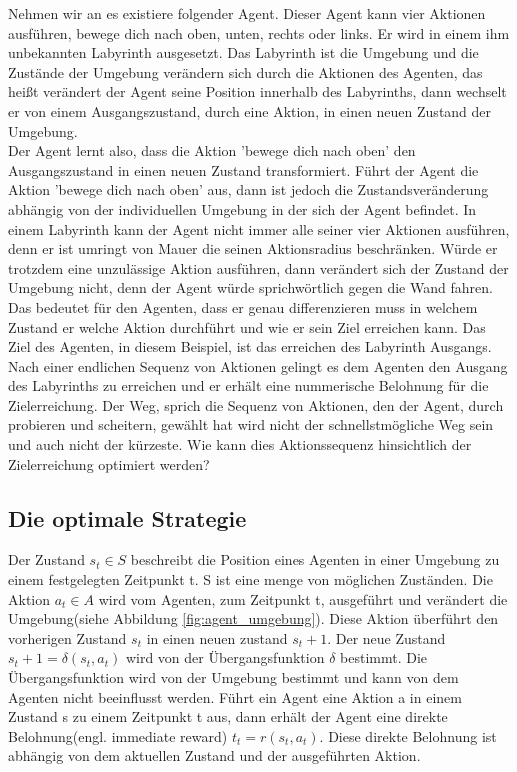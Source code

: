 Nehmen wir an es existiere folgender Agent. Dieser Agent kann vier Aktionen ausführen, bewege dich nach oben, unten, rechts oder links. Er wird in einem ihm unbekannten Labyrinth ausgesetzt. Das Labyrinth ist die Umgebung und die Zustände der Umgebung verändern sich durch die Aktionen des Agenten, das heißt verändert der Agent seine Position innerhalb des Labyrinths, dann wechselt er von einem Ausgangszustand, durch eine Aktion, in einen neuen Zustand der Umgebung. \\

Der Agent lernt also, dass die Aktion 'bewege dich nach oben' den Ausgangszustand in einen neuen Zustand transformiert. Führt der Agent die Aktion 'bewege dich nach oben' aus, dann ist jedoch die Zustandsveränderung abhängig von der individuellen Umgebung in der sich der Agent befindet. In einem Labyrinth kann der Agent nicht immer alle seiner vier Aktionen ausführen, denn er ist umringt von Mauer die seinen Aktionsradius beschränken. Würde er trotzdem eine unzulässige Aktion ausführen, dann verändert sich der Zustand der Umgebung nicht, denn der Agent würde sprichwörtlich gegen die Wand fahren. Das bedeutet für den Agenten, dass er genau differenzieren muss in welchem Zustand er welche Aktion durchführt und wie er sein Ziel erreichen kann. Das Ziel des Agenten, in diesem Beispiel, ist das erreichen des Labyrinth Ausgangs. \\

Nach einer endlichen Sequenz von Aktionen gelingt es dem Agenten den Ausgang des Labyrinths zu erreichen und er erhält eine nummerische Belohnung für die Zielerreichung. Der Weg, sprich die Sequenz von Aktionen, den der Agent, durch probieren und scheitern, gewählt hat wird nicht der schnellstmögliche Weg sein und auch nicht der kürzeste. Wie kann dies Aktionssequenz hinsichtlich der Zielerreichung optimiert werden? \\

\subsection{Die optimale Strategie}
Der Zustand $s_t \in S$ beschreibt die Position eines Agenten in einer Umgebung zu einem festgelegten Zeitpunkt t. S ist eine menge von möglichen Zuständen. Die Aktion $a_t \in A$ wird vom Agenten, zum Zeitpunkt t, ausgeführt und verändert die Umgebung(siehe Abbildung \ref{fig:agent_umgebung}). Diese Aktion überführt den vorherigen Zustand $s_t$ in einen neuen zustand $s_t+1$. Der neue Zustand $s_t+1 = \delta(s_t, a_t)$ wird von der Übergangsfunktion $\delta$ bestimmt. Die Übergangsfunktion wird von der Umgebung bestimmt und kann von dem Agenten nicht beeinflusst werden. Führt ein Agent eine Aktion a in einem Zustand s zu einem Zeitpunkt t aus, dann erhält der Agent eine direkte Belohnung(engl. immediate reward) $t_t = r(s_t, a_t)$. Diese direkte Belohnung ist abhängig von dem aktuellen Zustand und der ausgeführten Aktion.\\

